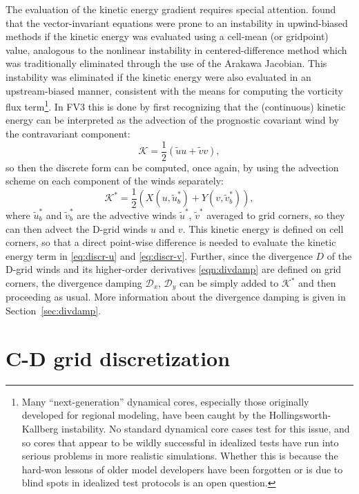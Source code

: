 \documentclass[10pt,letterpaper,margin=1in]{memoir}
\begin{document}
The evaluation of the kinetic energy gradient requires special attention. \citet{HollingsworthKallberg1984} found that the vector-invariant equations were prone to an instability in upwind-biased methods if the kinetic energy was evaluated using a cell-mean (or gridpoint) value, analogous to the nonlinear instability in centered-difference method which was traditionally eliminated through the use of the Arakawa Jacobian. This instability was eliminated if the kinetic energy were also evaluated in an upstream-biased manner, consistent with the means for computing the vorticity flux term\footnote{Many ``next-generation'' dynamical cores, especially those originally developed for regional modeling, have been caught by the Hollingsworth-Kallberg instability. No standard dynamical core cases test for this issue, and so cores that appear to be wildly successful in idealized tests have run into serious problems in more realistic simulations. Whether this is because the hard-won lessons of older model developers have been forgotten or is due to blind spots in idealized test protocols is an open question.}. In FV3 this is done by first recognizing that the (continuous) kinetic energy can be interpreted as the advection of the prognostic covariant wind by the contravariant component:
\begin{equation}
\mathcal{K} = \frac{1}{2} \left ( \widetilde{u}u + \widetilde{v}v \right ),
\end{equation}
so then the discrete form can be computed, once again, by using the advection scheme on each component of the winds separately:
\begin{equation}
\mathcal{K}^* = \frac{1}{2} \left ( X(u, \widetilde{u}^*_b) + Y(v, \widetilde{v}^*_b) \right ),
\end{equation} 
where $\widetilde{u}^*_b$ and $\widetilde{v}^*_b$ are the advective winds $\widetilde{u}^*$, $\widetilde{v}^*$ averaged to grid corners, so they can then advect the D-grid winds $u$ and $v$. This kinetic energy is defined on cell corners, so that a direct point-wise difference is needed to evaluate the kinetic energy term in \eqref{eq:discr-u} and \eqref{eq:discr-v}. Further, since the divergence $D$ of the D-grid winds and its higher-order derivatives \eqref{eqn:divdamp} are defined on grid corners, the divergence damping $\mathcal{D}_x$, $\mathcal{D}_y$ can be simply added to $\mathcal{K}^*$ and then proceeding as usual. More information about the divergence damping is given in Section~\ref{sec:divdamp}.


\section{C-D grid discretization} \label{sec:CDgrid}
\end{document}
